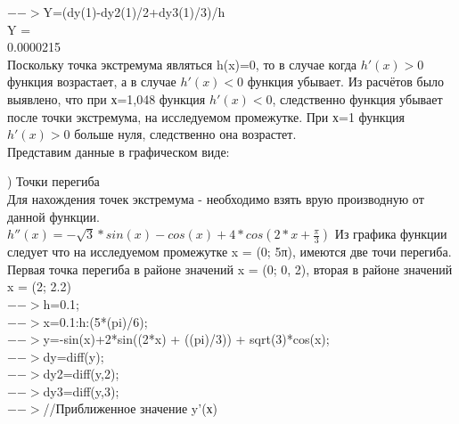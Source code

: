 \documentclass[russian,utf8,nocolumnxxxi,nocolumnxxxii]{eskdtext}
\begin{document}
  $-->$Y=(dy(1)-dy2(1)/2+dy3(1)/3)/h\\
 Y  =\\

    0.0000215\\

Поскольку точка экстремума являться h(x)=0, то в случае когда $h'(x)>0$ функция возрастает, а в случае $h'(x)<0$ функция убывает. Из расчётов было выявлено, что при х=1,048 функция $h'(x)<0$, следственно функция убывает после точки экстремума, на исследуемом промежутке. При х=1 функция $h'(x)>0$ больше нуля, следственно она возрастет.\\

Представим данные в графическом виде:

\begin{center}
\end{center}

) Точки перегиба\\
Для нахождения точек экстремума - необходимо взять врую производную от данной функции.\\
$h''(x)=-\sqrt3*sin(x)-cos(x)+4*cos(2*x + \frac{\pi}{3})$
Из графика функции следует что на исследуемом промежутке x = (0; 5π), имеются
две точи перегиба. Первая точка перегиба в районе значений x = (0; 0, 2), вторая
в районе значений x = (2; 2.2)\\

  $-->$h=0.1;\\

  $-->$x=0.1:h:(5*(pi)/6);\\

  $-->$y=-sin(x)+2*sin((2*x) + ((pi)/3)) + sqrt(3)*cos(x);\\

  $-->$dy=diff(y);\\

  $-->$dy2=diff(y,2);\\

  $-->$dy3=diff(y,3);\\

  $-->$//Приближенное значение y’(х)\\
\end{document}

